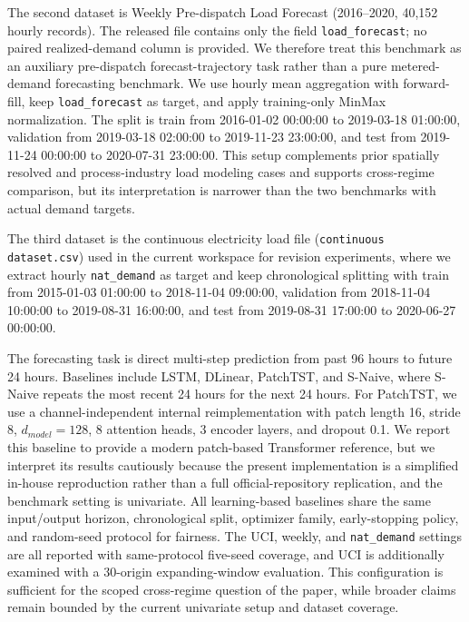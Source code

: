 \documentclass[pdflatex,sn-mathphys-num]{sn-jnl}
\theoremstyle{thmstyleone}
\theoremstyle{thmstyletwo}
\theoremstyle{thmstylethree}
\begin{document}
The second dataset is Weekly Pre-dispatch Load Forecast (2016--2020, 40,152 hourly records). The released file contains only the field \texttt{load\_forecast}; no paired realized-demand column is provided. We therefore treat this benchmark as an auxiliary pre-dispatch forecast-trajectory task rather than a pure metered-demand forecasting benchmark. We use hourly mean aggregation with forward-fill, keep \texttt{load\_forecast} as target, and apply training-only MinMax normalization. The split is train from 2016-01-02 00:00:00 to 2019-03-18 01:00:00, validation from 2019-03-18 02:00:00 to 2019-11-23 23:00:00, and test from 2019-11-24 00:00:00 to 2020-07-31 23:00:00. This setup complements prior spatially resolved and process-industry load modeling cases and supports cross-regime comparison, but its interpretation is narrower than the two benchmarks with actual demand targets.\cite{robinius2017topdown,hu2019shortterm}

The third dataset is the continuous electricity load file (\texttt{continuous dataset.csv}) used in the current workspace for revision experiments, where we extract hourly \texttt{nat\_demand} as target and keep chronological splitting with train from 2015-01-03 01:00:00 to 2018-11-04 09:00:00, validation from 2018-11-04 10:00:00 to 2019-08-31 16:00:00, and test from 2019-08-31 17:00:00 to 2020-06-27 00:00:00.

The forecasting task is direct multi-step prediction from past 96 hours to future 24 hours. Baselines include LSTM, DLinear, PatchTST, and S-Naive, where S-Naive repeats the most recent 24 hours for the next 24 hours. For PatchTST, we use a channel-independent internal reimplementation with patch length 16, stride 8, $d_{model}=128$, 8 attention heads, 3 encoder layers, and dropout 0.1. We report this baseline to provide a modern patch-based Transformer reference, but we interpret its results cautiously because the present implementation is a simplified in-house reproduction rather than a full official-repository replication, and the benchmark setting is univariate. All learning-based baselines share the same input/output horizon, chronological split, optimizer family, early-stopping policy, and random-seed protocol for fairness. The UCI, weekly, and \texttt{nat\_demand} settings are all reported with same-protocol five-seed coverage, and UCI is additionally examined with a 30-origin expanding-window evaluation. This configuration is sufficient for the scoped cross-regime question of the paper, while broader claims remain bounded by the current univariate setup and dataset coverage.
\end{document}
